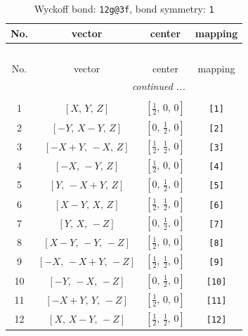 \documentclass[fleqn,8pt]{jsarticle}
\begin{document}
\begin{longtable}{cccc}
\caption{Wyckoff bond: {\tt 12g@3f}, bond symmetry: {\tt 1}}
 \\
 \hline \hline
No. & vector & center & mapping \\ \hline \endfirsthead

\multicolumn{3}{l}{\tablename\ \thetable{}} \\
 \hline \hline
No. & vector & center & mapping \\ \hline \endhead

 \hline \hline
\multicolumn{3}{r}{\footnotesize\it continued ...} \\ \endfoot

 \hline \hline
\multicolumn{3}{r}{} \\ \endlastfoot

1 & $\left[ X,\, Y,\, Z \right]$ & $\left[ \frac{1}{2},\, 0,\, 0 \right]$ & {\tt [1]} \\ \hline
2 & $\left[ - Y,\, X - Y,\, Z \right]$ & $\left[ 0,\, \frac{1}{2},\, 0 \right]$ & {\tt [2]} \\ \hline
3 & $\left[ - X + Y,\, - X,\, Z \right]$ & $\left[ \frac{1}{2},\, \frac{1}{2},\, 0 \right]$ & {\tt [3]} \\ \hline
4 & $\left[ - X,\, - Y,\, Z \right]$ & $\left[ \frac{1}{2},\, 0,\, 0 \right]$ & {\tt [4]} \\ \hline
5 & $\left[ Y,\, - X + Y,\, Z \right]$ & $\left[ 0,\, \frac{1}{2},\, 0 \right]$ & {\tt [5]} \\ \hline
6 & $\left[ X - Y,\, X,\, Z \right]$ & $\left[ \frac{1}{2},\, \frac{1}{2},\, 0 \right]$ & {\tt [6]} \\ \hline
7 & $\left[ Y,\, X,\, - Z \right]$ & $\left[ 0,\, \frac{1}{2},\, 0 \right]$ & {\tt [7]} \\ \hline
8 & $\left[ X - Y,\, - Y,\, - Z \right]$ & $\left[ \frac{1}{2},\, 0,\, 0 \right]$ & {\tt [8]} \\ \hline
9 & $\left[ - X,\, - X + Y,\, - Z \right]$ & $\left[ \frac{1}{2},\, \frac{1}{2},\, 0 \right]$ & {\tt [9]} \\ \hline
10 & $\left[ - Y,\, - X,\, - Z \right]$ & $\left[ 0,\, \frac{1}{2},\, 0 \right]$ & {\tt [10]} \\ \hline
11 & $\left[ - X + Y,\, Y,\, - Z \right]$ & $\left[ \frac{1}{2},\, 0,\, 0 \right]$ & {\tt [11]} \\ \hline
12 & $\left[ X,\, X - Y,\, - Z \right]$ & $\left[ \frac{1}{2},\, \frac{1}{2},\, 0 \right]$ & {\tt [12]} \\
\end{longtable}
\end{document}
